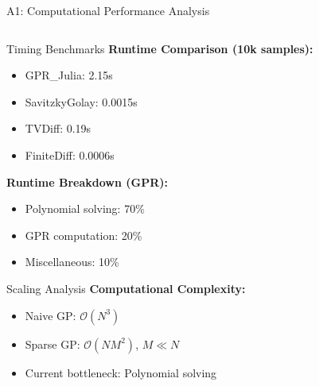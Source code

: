 \documentclass[aspectratio=169]{beamer}
\begin{document}
\begin{frame}{A1: Computational Performance Analysis}
  
  \begin{columns}[t]
    \begin{column}{0.48\textwidth}
      \begin{block}{\small Timing Benchmarks}
        \tiny
        \textbf{Runtime Comparison (10k samples):}
        \begin{itemize}
          \item GPR\_Julia: 2.15s
          \item SavitzkyGolay: 0.0015s  
          \item TVDiff: 0.19s
          \item FiniteDiff: 0.0006s
        \end{itemize}
        
        \vspace{0.5em}
        \textbf{Runtime Breakdown (GPR):}
        \begin{itemize}
          \item Polynomial solving: 70\%
          \item GPR computation: 20\%
          \item Miscellaneous: 10\%
        \end{itemize}
      \end{block}
      
      \vspace{0.5em}
      \begin{block}{\small Scaling Analysis}
        \tiny
        \textbf{Computational Complexity:}
        \begin{itemize}
          \item Naive GP: $\mathcal{O}(N^3)$
          \item Sparse GP: $\mathcal{O}(NM^2)$, $M \ll N$
          \item Current bottleneck: Polynomial solving
        \end{itemize}
      \end{block}
    \end{column}
    
    \begin{column}{0.48\textwidth}
      \begin{center}
      \end{center}
      

\end{column}
\end{columns}
\end{frame}
\end{document}
